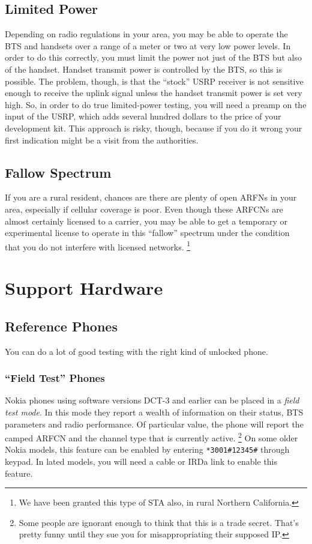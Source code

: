 \documentclass[11pt]{book}
\begin{document}
\subsection{Limited Power}
Depending on radio regulations in your area, you may be able to operate the BTS and handsets over a range of a meter or two at very low power levels.  In order to do this correctly, you must limit the power not just of the BTS but also of the handset.  Handset transmit power is controlled by the BTS, so this is possible.  The problem, though, is that the ``stock'' USRP receiver is not sensitive enough to receive the uplink signal unless the handset transmit power is set very high.  So, in order to do true limited-power testing, you will need a preamp on the input of the USRP, which adds several hundred dollars to the price of your development kit.
This approach is risky, though, because if you do it wrong your first indication might be a visit from the authorities.  

\subsection{Fallow Spectrum}
If you are a rural resident, chances are there are plenty of open ARFNs in your area, especially if cellular coverage is poor.  Even though these ARFCNs are almost certainly licensed to a carrier, you may be able to get a temporary or experimental license to operate in this ``fallow'' spectrum under the condition that you do not interfere with licensed networks.%
\footnote{We have been granted this type of STA also, in rural Northern California.}



\section{Support Hardware}


\subsection{Reference Phones}
You can do a lot of good testing with the right kind of unlocked phone.

\subsubsection{``Field Test'' Phones}
Nokia phones using software versions DCT-3 and earlier can be placed in a \emph{field test mode}. In this mode they report a wealth of information on their status, BTS parameters and radio performance.
Of particular value, the phone will report the camped ARFCN and the channel type that is currently active.%
\footnote{Some people are ignorant enough to think that this is a trade secret.  That's pretty funny until they sue you for misappropriating their supposed IP.}
On some older Nokia models, this feature can be enabled by entering \verb|*3001#12345#| through keypad.
In lated models, you will need a cable or IRDa link to enable this feature.
\end{document}
